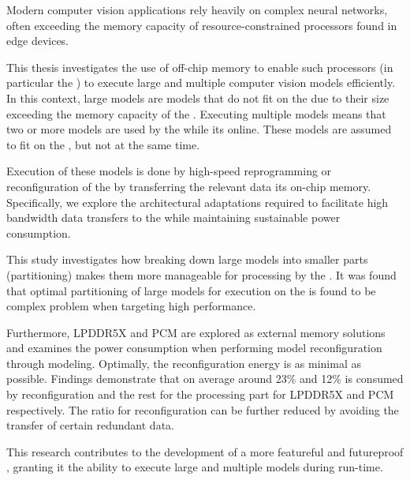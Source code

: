 Modern computer vision applications rely heavily on complex neural networks, often exceeding the memory capacity of resource-constrained processors found in edge devices.

This thesis investigates the use of off-chip memory to enable such processors (in particular the \graicore{}) to execute large and multiple computer vision models efficiently.
In this context, large models are models that do not fit on the \graicore{} due to their size exceeding the memory capacity of the \graicore{}.
Executing multiple models means that two or more models are used by the \graicore{} while its online.
These models are assumed to fit on the \graicore{}, but not at the same time.

Execution of these models is done by high-speed reprogramming or reconfiguration of the \graicore{} by transferring the relevant data its on-chip memory.
Specifically, we explore the architectural adaptations required to facilitate high bandwidth data transfers to the \graicore{} while maintaining sustainable power consumption.

This study investigates how breaking down large models into smaller parts (partitioning) makes them more manageable for processing by the \graicore{}.
It was found that optimal partitioning of large models for execution on the \graicore{} is found to be complex problem when targeting high performance.

Furthermore, LPDDR5X and PCM are explored as external memory solutions and examines the power consumption when performing model reconfiguration through modeling.
Optimally, the reconfiguration energy is as minimal as possible.
Findings demonstrate that on average around 23\% and 12\% is consumed by reconfiguration and the rest for the processing part for LPDDR5X and PCM respectively.
The ratio for reconfiguration can be further reduced by avoiding the transfer of certain redundant data.

This research contributes to the development of a more featureful and futureproof \graicore{}, granting it the ability to execute large and multiple models during run-time.
